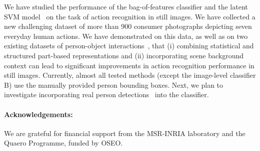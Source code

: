 \documentclass{bmvc2k}
\begin{document}
We have studied the performance of the bag-of-features classifier and the latent SVM
model~\cite{Felzenszwalb09} on the task of action recognition in still images.
We have collected a new challenging dataset of more than 900 consumer photographs depicting seven everyday human actions.
We have demonstrated on this data, as well as on two existing datasets of person-object interactions~\cite{Gupta09,FeiFei10a},  that  (i) combining statistical and structured part-based representations and (ii) incorporating scene background context can lead to significant improvements in action recognition performance in still images. 
Currently, almost all tested methods (except the image-level classifier B) use the manually provided person bounding boxes. 
Next, we plan to investigate incorporating real person detections~\cite{Dalal05,Felzenszwalb09} into the classifier.



\paragraph{Acknowledgements:}  
We are grateful for financial support 
from the MSR-INRIA laboratory and the Quaero Programme, funded by OSEO.
 

%

 

%



\end{document}
